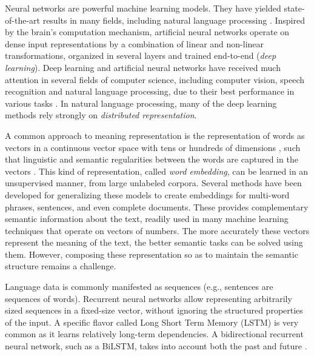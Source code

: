 \documentclass[12pt,a4paper,table]{report}
\renewcommand\cite{\citep}      %
\begin{document}
Neural networks are powerful machine learning models.
They have yielded state-of-the-art results in many fields,
including natural language processing \citep{goldberg2016primer}.
Inspired by the brain's computation mechanism,
artificial neural networks operate on dense input representations
by a combination of linear and non-linear transformations,
organized in several layers and trained end-to-end (\textit{deep learning}).
Deep learning and artificial neural networks have received much attention in
several fields of computer science, including computer vision, speech
recognition and natural language processing, due to their best performance in
various tasks \cite{collobert2011natural}.
In natural language processing, many of the deep learning methods rely strongly
on \textit{distributed representation}.

A common approach to meaning representation is the
representation of words as vectors in a continuous vector space with tens or
hundreds of dimensions \cite{turian2010word}, such that linguistic and semantic
regularities between the words are captured in the
vectors \cite{mikolov2013linguistic}. This kind of representation, called
\textit{word embedding}, can be learned in an unsupervised manner, from large
unlabeled corpora.
Several methods have been developed for generalizing these models to create embeddings
for multi-word phrases, sentences, and even complete documents.
These provides complementary semantic information about the text,
readily used in many machine learning techniques that operate on vectors of numbers.
The more accurately these vectors represent the meaning of the text, the better semantic tasks
can be solved using them.
However, composing these representation so as to maintain the semantic structure remains a challenge.

Language data is commonly manifested as sequences
(e.g., sentences are sequences of words).
Recurrent neural networks \citep{elman1990finding} allow representing
arbitrarily sized sequences in a fixed-size vector,
without ignoring the structured properties of the input.
A specific flavor called Long Short Term Memory
(LSTM) is very common as it learns relatively long-term dependencies.
A bidirectional recurrent neural network, such as a BiLSTM,
takes into account both the past and future
\cite{hochreiter1997long,schuster1997bidirectional,graves2008supervised,irsoy2014opinion}.
\end{document}
